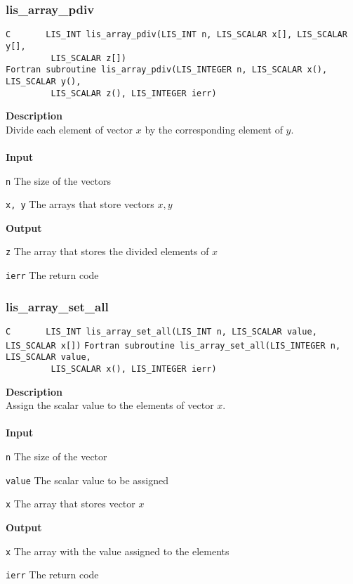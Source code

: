 \documentclass[a4paper]{article}
\newcommand{\namelistlabel}[1]{\mbox{#1}\hfill}
\newenvironment{namelist}[1]{%
\begin{list}{}
  {\let\makelabel\namelistlabel
  \settowidth{\labelwidth}{#1}
  \setlength{\leftmargin}{1.1\labelwidth}}
  }{%
\end{list}}
\begin{document}
\subsubsection{lis\_array\_pdiv}
\begin{screen}
\verb|C       LIS_INT lis_array_pdiv(LIS_INT n, LIS_SCALAR x[], LIS_SCALAR y[],|\\
\verb|         LIS_SCALAR z[])|\\
\verb|Fortran subroutine lis_array_pdiv(LIS_INTEGER n, LIS_SCALAR x(), LIS_SCALAR y(),|\\
\verb|         LIS_SCALAR z(), LIS_INTEGER ierr)|
\end{screen}
{\bf Description}\\
\indent
Divide each element of vector $x$ by the corresponding element of $y$.
\\ \\
\noindent
{\bf Input}
\begin{namelist}{XXXXXXXXXXXXXXXXXXXX}
\item[\tt n] The size of the vectors  
\item[\tt x, y] The arrays that store vectors $x, y$
\end{namelist}
{\bf Output}
\begin{namelist}{XXXXXXXXXXXXXXXXXXXX}
\item[\tt z] The array that stores the divided elements of $x$
\item[\tt ierr] The return code
\end{namelist}

\newpage
\subsubsection{lis\_array\_set\_all}
\begin{screen}
\verb|C       LIS_INT lis_array_set_all(LIS_INT n, LIS_SCALAR value, LIS_SCALAR x[])|
\verb|Fortran subroutine lis_array_set_all(LIS_INTEGER n, LIS_SCALAR value,|\\
\verb|         LIS_SCALAR x(), LIS_INTEGER ierr)|
\end{screen}
{\bf Description}\\
\indent
Assign the scalar value to the elements of vector $x$.
\\ \\
\noindent
{\bf Input}
\begin{namelist}{XXXXXXXXXXXXXXXXXXXX}
\item[\tt n] The size of the vector
\item[\tt value] The scalar value to be assigned
\item[\tt x] The array that stores vector $x$
\end{namelist}
{\bf Output}
\begin{namelist}{XXXXXXXXXXXXXXXXXXXX}
\item[\tt x] The array with the value assigned to the elements
\item[\tt ierr] The return code
\end{namelist}
\end{document}
